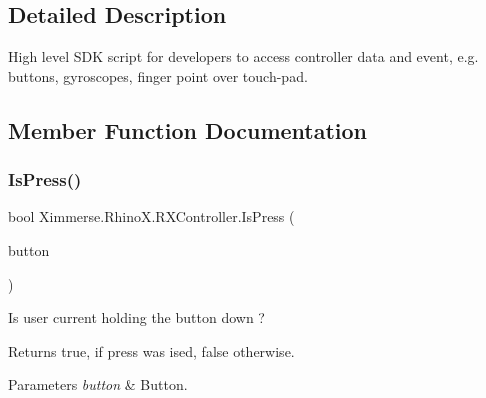 \subsection{Detailed Description}
High level S\+DK script for developers to access controller data and event, e.\+g. buttons, gyroscopes, finger point over touch-\/pad. 



\subsection{Member Function Documentation}
\mbox{\label{class_ximmerse_1_1_rhino_x_1_1_r_x_controller_aa9d23fdcda8d7e24e342c26e5b8d6b27}} 
\subsubsection{\texorpdfstring{Is\+Press()}{IsPress()}}
{\footnotesize\ttfamily bool Ximmerse.\+Rhino\+X.\+R\+X\+Controller.\+Is\+Press (\begin{DoxyParamCaption}\item[{\mbox{\hyperlink{namespace_ximmerse_1_1_rhino_x_a99f73f11bba9d4b424daba6c5a5abc0b}{Controller\+Button\+Code}}}]{button }\end{DoxyParamCaption})}



Is user current holding the button down ? 

\begin{DoxyReturn}{Returns}
{\ttfamily true}, if press was ised, {\ttfamily false} otherwise.
\end{DoxyReturn}

\begin{DoxyParams}{Parameters}
{\em button} & Button.\\
\hline
\end{DoxyParams}
\mbox{\label{class_ximmerse_1_1_rhino_x_1_1_r_x_controller_a89fb2bd2521d43205645fb6b205ddbcf}} 
